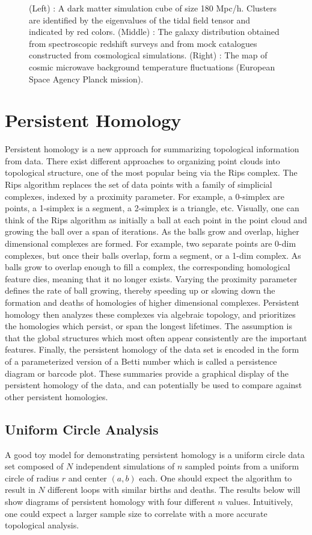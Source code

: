 \documentclass[12pt]{article}
\begin{document}
\begin{figure}[!htb]
\endminipage\hfill
\caption{(Left) : A dark matter simulation cube of size 180 Mpc/h. Clusters are identified by the eigenvalues of the tidal field tensor and indicated by red colors. (Middle) : The galaxy distribution obtained from spectroscopic redshift surveys and from mock catalogues constructed from cosmological simulations. (Right) : The map of cosmic microwave background temperature fluctuations (European Space Agency Planck mission). }
\end{figure}

\section{Persistent Homology}
Persistent homology is a new approach for summarizing topological information from data. There exist different approaches to organizing point clouds into topological structure, one of the most popular being via the Rips complex. The Rips algorithm replaces the set of data points with a family of simplicial complexes, indexed by a proximity parameter. For example, a 0-simplex are points, a 1-simplex is a segment, a 2-simplex is a triangle, etc. Visually, one can think of the Rips algorithm as initially a ball at each point in the point cloud and growing the ball over a span of iterations. As the balls grow and overlap, higher dimensional complexes are formed. For example, two separate points are 0-dim complexes, but once their balls overlap, form a segment, or a 1-dim complex. As balls grow to overlap enough to fill a complex, the corresponding homological feature dies, meaning that it no longer exists. Varying the proximity parameter defines the rate of ball growing, thereby speeding up or slowing down the formation and deaths of homologies of higher dimensional complexes. Persistent homology then analyzes these complexes via algebraic topology, and prioritizes the homologies which persist, or span the longest lifetimes. The assumption is that the global structures which most often appear consistently are the important features. Finally, the persistent homology of the data set is encoded in the form of a parameterized version of a Betti number which is called a persistence diagram or barcode plot. These summaries provide a graphical display of the persistent homology of the data, and can potentially be used to compare against other persistent homologies.

\subsection{Uniform Circle Analysis}
A good toy model for demonstrating persistent homology is a uniform circle data set composed of $N$ independent simulations of $n$ sampled points from a uniform circle of radius $r$ and center $(a, b)$ each. One should expect the algorithm to result in $N$ different loops with similar births and deaths. The results below will show diagrams of persistent homology with four different $n$ values. Intuitively, one could expect a larger sample size to correlate with a more accurate topological analysis. 
\end{document}
